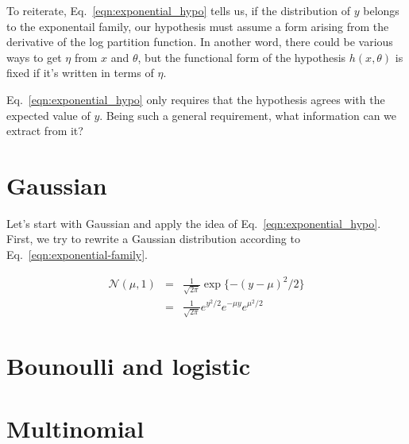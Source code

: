To reiterate, Eq.~\ref{eqn:exponential_hypo} tells us, if the distribution of $y$ belongs to the exponentail family, our hypothesis must assume a form arising from the derivative of the log partition function. In another word, there could be various ways to get $\eta$ from $x$ and $\theta$, but the functional form of the hypothesis $h(x, \theta)$ is fixed if it's written in terms of $\eta$.

Eq.~\ref{eqn:exponential_hypo} only requires that the hypothesis agrees with the expected value of $y$. Being such a general requirement, what information can we extract from it?

\section{Gaussian}
Let's start with Gaussian and apply the idea of Eq.~\ref{eqn:exponential_hypo}. First, we try to rewrite a Gaussian distribution according to Eq.~\ref{eqn:exponential-family}.

\begin{eqnarray}
	\mathcal N(\mu, 1)&=&\frac{1}{\sqrt{2\pi}}\exp\{-(y-\mu)^2/2\}\\
		   &=&\frac{1}{\sqrt{2\pi}}e^{y^2/2}e^{-\mu y}e^{\mu^2/2}
\end{eqnarray}



\section{Bounoulli and logistic}

\section{Multinomial}

